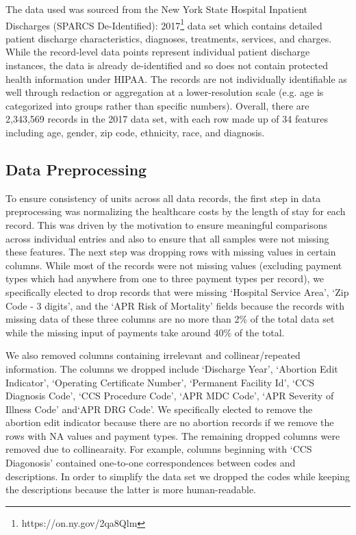 \documentclass[10pt,twocolumn,letterpaper]{article}
\begin{document}
The data used was sourced from the New York State Hospital Inpatient Discharges (SPARCS De-Identified): 2017\footnote{https://on.ny.gov/2qa8Qlm} data set which contains detailed patient discharge characteristics, diagnoses, treatments, services, and charges. While the record-level data points represent individual patient discharge instances, the data is already de-identified and so does not contain protected  health information under HIPAA. The records are not individually identifiable as well through redaction or aggregation at a lower-resolution scale (e.g. age is categorized into groups rather than specific numbers). Overall, there are 2,343,569 records in the 2017 data set, with each row made up of 34 features including age, gender, zip code, ethnicity, race, and diagnosis. 


\subsection{Data Preprocessing}
To ensure consistency of units across all data records, the first step in data preprocessing was normalizing the healthcare costs by the length of stay for each record. This was driven by the motivation to ensure meaningful comparisons across individual entries and also to ensure that all samples were not missing these features. The next step was dropping rows with missing values in certain columns. While most of the records were not missing values (excluding payment types which had anywhere from one to three payment types per record), we specifically elected to drop records that were missing `Hospital Service Area', `Zip Code - 3 digits', and the `APR Risk of Mortality' fields because the records with missing data of these three columns are no more than 2\% of the total data set while the missing input of payments take around 40\% of the total.

We also removed columns containing irrelevant and collinear/repeated information. The columns we dropped include `Discharge Year', `Abortion Edit Indicator', `Operating Certificate Number', `Permanent Facility Id', `CCS Diagnosis Code', `CCS Procedure Code', `APR MDC Code', `APR Severity of Illness Code' and`APR DRG Code'. We specifically elected to remove the abortion edit indicator because there are no abortion records if we remove the rows with NA values and payment types. The remaining dropped columns were removed due to collinearaity. For example, columns beginning with `CCS Diagonosis' contained one-to-one correspondences between codes and descriptions. In order to simplify the data set we dropped the codes while keeping the descriptions because the latter is more human-readable.
\end{document}
